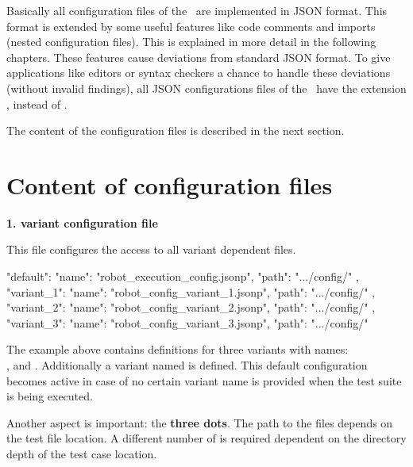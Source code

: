 Basically all configuration files of the \pkg\ are implemented in JSON format. This format is extended by some useful features like
code comments and imports (nested configuration files). This is explained in more detail in the following chapters.
These features cause deviations from standard JSON format. To give applications like editors or syntax checkers a chance to handle
these deviations (without invalid findings), all JSON configurations files of the \pkg\ have the extension , instead of .

The content of the configuration files is described in the next section.


\section{Content of configuration files}

\textbf{1. variant configuration file}

This file configures the access to all variant dependent  files.

\begin{pythoncode}
{
  "default": {
               "name": "robot_execution_config.jsonp",
               "path": ".../config/"
             },
  "variant_1": {
                 "name": "robot_config_variant_1.jsonp",
                 "path": ".../config/"
               },
  "variant_2": {
                 "name": "robot_config_variant_2.jsonp",
                 "path": ".../config/"
               },
  "variant_3": {
                 "name": "robot_config_variant_3.jsonp",
                 "path": ".../config/"
               }
}
\end{pythoncode}

The example above contains definitions for three variants with names:\\
,  and . Additionally a variant named  is defined.
This default configuration becomes active in case of no certain variant name is provided when the test suite is being executed.

Another aspect is important: the \textbf{three dots}.
The path to the  files depends on the test file location. A
different number of  is required dependent on the directory depth of the test
case location.

